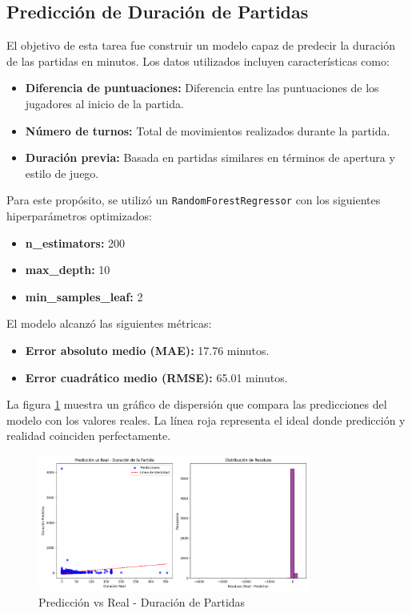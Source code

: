 \documentclass[a4paper,12pt]{article}
\begin{document}
\subsection{Predicción de Duración de Partidas}

El objetivo de esta tarea fue construir un modelo capaz de predecir la duración de las partidas en minutos. Los datos utilizados incluyen características como:
\begin{itemize}
    \item \textbf{Diferencia de puntuaciones:} Diferencia entre las puntuaciones de los jugadores al inicio de la partida.
    \item \textbf{Número de turnos:} Total de movimientos realizados durante la partida.
    \item \textbf{Duración previa:} Basada en partidas similares en términos de apertura y estilo de juego.
\end{itemize}

Para este propósito, se utilizó un \texttt{RandomForestRegressor} con los siguientes hiperparámetros optimizados:
\begin{itemize}
    \item \textbf{n\_estimators:} 200
    \item \textbf{max\_depth:} 10
    \item \textbf{min\_samples\_leaf:} 2
\end{itemize}


El modelo alcanzó las siguientes métricas:
\begin{itemize}
    \item \textbf{Error absoluto medio (MAE):} 17.76 minutos.
    \item \textbf{Error cuadrático medio (RMSE):} 65.01 minutos.
\end{itemize}

La figura \ref{fig:duracion_partidas} muestra un gráfico de dispersión que compara las predicciones del modelo con los valores reales. La línea roja representa el ideal donde predicción y realidad coinciden perfectamente. 

\vspace{10pt} %
\begin{figure}[H]
    \centering
    \includegraphics[width=0.8\textwidth]{../images/Figure_1_-dur_partidas.png}
    \caption{Predicción vs Real - Duración de Partidas}
    \label{fig:duracion_partidas}
\end{figure}
\end{document}

